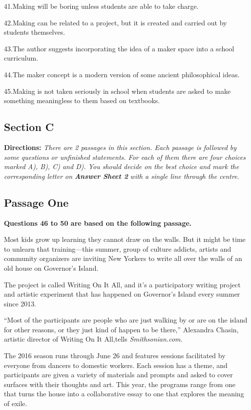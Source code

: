 \documentclass[UTF8,11pt]{ctexart}
\begin{document}
41.Making will be boring unless students are able to take charge.


42.Making can be related to a project, but it is created and carried out by students themselves.


43.The author suggests incorporating the idea of a maker space into a school curriculum.


44.The maker concept is a modern version of some ancient philosophical ideas.


45.Making is not taken seriously in school when students are asked to make something meaningless to them based on textbooks.


\subsection*{\textbf{Section C}}


\textbf{Directions:}\textit{ There are 2 passages in this section. Each passage is followed by some questions or unfinished} \textit{statements. For each of them there are four choices marked A), B), C) and D). You should decide on the best} \textit{choice and mark the corresponding letter on}\textbf{\textit{ Answer Sheet 2}}\textit{ with a single line through the centre.}


\subsection*{\textbf{Passage One}}


\textbf{Questions 46 to 50 are based on the following passage.}


Most kids grow up learning they cannot draw on the walls. But it might be time to unlearn that training—this summer, group of culture addicts, artists and community organizers are inviting New Yorkers to write all over the walls of an old house on Governor’s Island.


The project is called Writing On It All, and it’s a participatory writing project and artistic experiment that has happened on Governor’s Island every summer since 2013.


“Most of the participants are people who are just walking by or are on the island for other reasons, or they just kind of happen to be there,” Alexandra Chasin, artistic director of Writing On It All,tells\textit{ Smithsonian.com}.


The 2016 season runs through June 26 and features sessions facilitated by everyone from dancers to domestic workers. Each session has a theme, and participants are given a variety of materials and prompts and asked to cover surfaces with their thoughts and art. This year, the programs range from one that turns the house into a collaborative essay to one that explores the meaning of exile.
\end{document}
